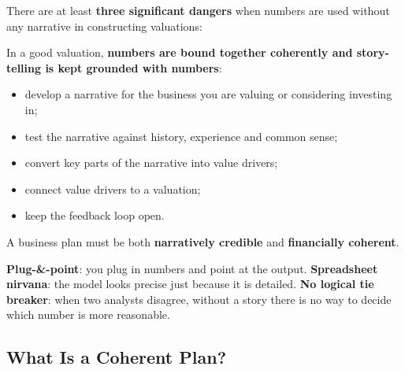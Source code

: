 There are at least \textbf{three significant dangers} when numbers are used without any narrative in constructing valuations:
\begin{center}
\end{center}
In a good valuation, \textbf{numbers are bound together coherently and story-telling is kept grounded with numbers}:
\begin{itemize}
  \item develop a narrative for the business you are valuing or considering investing in;
  \item test the narrative against history, experience and common sense;
  \item convert key parts of the narrative into value drivers;
  \item connect value drivers to a valuation;
  \item keep the feedback loop open.
\end{itemize}
\begin{keybox}
A business plan must be both \textbf{narratively credible} and \textbf{financially coherent}.
\end{keybox}
\begin{addbox}
\textbf{Plug-\&-point}: you plug in numbers and point at the output. \textbf{Spreadsheet nirvana}: the model looks precise just because it is detailed. \textbf{No logical tie breaker}: when two analysts disagree, without a story there is no way to decide which number is more reasonable.
\end{addbox}

\subsection[What Is a Coherent Plan?]{What Is a Coherent Plan? }


